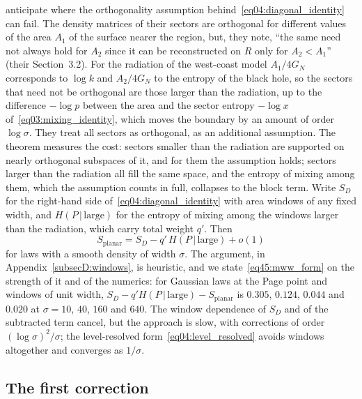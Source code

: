 \documentclass[11pt,letterpaper]{article}
\theoremstyle{plain}
\theoremstyle{definition}
\theoremstyle{remark}
\begin{document}
\citet{marolfwangwang2020} anticipate where the orthogonality assumption behind~\eqref{eq04:diagonal_identity} can fail. The density matrices of their sectors are orthogonal for different values of the area $A_1$ of the surface nearer the region, but, they note, ``the same need not always hold for $A_2$ since it can be reconstructed on $R$ only for $A_2 < A_1$'' (their Section~3.2). For the radiation of the west-coast model $A_1/4G_N$ corresponds to $\log k$ and $A_2/4G_N$ to the entropy of the black hole, so the sectors that need not be orthogonal are those larger than the radiation, up to the difference $-\log p$ between the area and the sector entropy $-\log x$ of~\eqref{eq03:mixing_identity}, which moves the boundary by an amount of order $\log\sigma$. They treat all sectors as orthogonal, as an additional assumption. The theorem measures the cost: sectors smaller than the radiation are supported on nearly orthogonal subspaces of it, and for them the assumption holds; sectors larger than the radiation all fill the same space, and the entropy of mixing among them, which the assumption counts in full, collapses to the block term. Write $S_D$ for the right-hand side of~\eqref{eq04:diagonal_identity} with area windows of any fixed width, and $H(P\,|\,\mathrm{large})$ for the entropy of mixing among the windows larger than the radiation, which carry total weight $q'$. Then
\begin{equation}
\label{eq45:mww_form}
S_{\mathrm{planar}} = S_D - q'\, H(P\,|\,\mathrm{large}) + o(1)
\end{equation}
for laws with a smooth density of width $\sigma$. The argument, in Appendix~\ref{subsecD:windows}, is heuristic, and we state~\eqref{eq45:mww_form} on the strength of it and of the numerics: for Gaussian laws at the Page point and windows of unit width, $S_D - q' H(P\,|\,\mathrm{large}) - S_{\mathrm{planar}}$ is $0.305$, $0.124$, $0.044$ and $0.020$ at $\sigma = 10$, $40$, $160$ and $640$. The window dependence of $S_D$ and of the subtracted term cancel, but the approach is slow, with corrections of order $(\log\sigma)^2/\sigma$; the level-resolved form~\eqref{eq04:level_resolved} avoids windows altogether and converges as $1/\sigma$.

\subsection{The first correction}
\label{subsec45:first_order}
\end{document}
